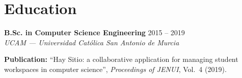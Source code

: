 \documentclass[a4paper,9pt]{extarticle}
\newcommand{\formacion}[3]{%
  \noindent
  \textbf{#1} \hfill {\small\color{gris}#3}\\[0.05em]
  {\color{gris}\textit{#2}}\par
  \vspace{0.08em}
}
\begin{document}
\section{Education}

\formacion
  {B.Sc. in Computer Science Engineering}
  {UCAM --- Universidad Cat\'olica San Antonio de Murcia}
  {2015 -- 2019}

{\footnotesize
\noindent \textbf{Publication:} ``Hay Sitio: a collaborative application for managing student workspaces in computer science'', \textit{Proceedings of JENUI}, Vol.\ 4 (2019).
}
\end{document}
